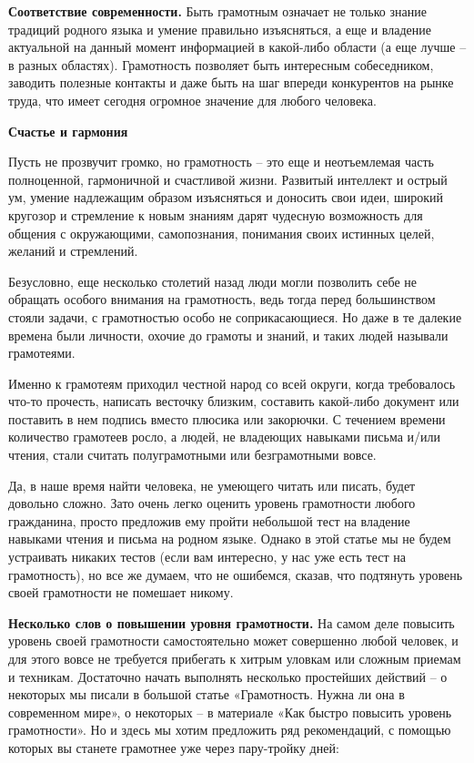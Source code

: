 \textbf{Соответствие современности.} Быть грамотным означает не только знание традиций родного языка и умение правильно изъясняться, а еще и владение актуальной на данный момент информацией в какой-либо области (а еще лучше – в разных областях). Грамотность позволяет быть интересным собеседником, заводить полезные контакты и даже быть на шаг впереди конкурентов на рынке труда, что имеет сегодня огромное значение для любого человека.

\textbf{Счастье и гармония}

Пусть не прозвучит громко, но грамотность – это еще и неотъемлемая часть полноценной, гармоничной и счастливой жизни. Развитый интеллект и острый ум, умение надлежащим образом изъясняться и доносить свои идеи, широкий кругозор и стремление к новым знаниям дарят чудесную возможность для общения с окружающими, самопознания, понимания своих истинных целей, желаний и стремлений.

Безусловно, еще несколько столетий назад люди могли позволить себе не обращать особого внимания на грамотность, ведь тогда перед большинством стояли задачи, с грамотностью особо не соприкасающиеся. Но даже в те далекие времена были личности, охочие до грамоты и знаний, и таких людей называли грамотеями.

Именно к грамотеям приходил честной народ со всей округи, когда требовалось что-то прочесть, написать весточку близким, составить какой-либо документ или поставить в нем подпись вместо плюсика или закорючки. С течением времени количество грамотеев росло, а людей, не владеющих навыками письма и/или чтения, стали считать полуграмотными или безграмотными вовсе.

Да, в наше время найти человека, не умеющего читать или писать, будет довольно сложно. Зато очень легко оценить уровень грамотности любого гражданина, просто предложив ему пройти небольшой тест на владение навыками чтения и письма на родном языке. Однако в этой статье мы не будем устраивать никаких тестов (если вам интересно, у нас уже есть тест на грамотность), но все же думаем, что не ошибемся, сказав, что подтянуть уровень своей грамотности не помешает никому.


\textbf{Несколько слов о повышении уровня грамотности.} На самом деле повысить уровень своей грамотности самостоятельно может совершенно любой человек, и для этого вовсе не требуется прибегать к хитрым уловкам или сложным приемам и техникам. Достаточно начать выполнять несколько простейших действий – о некоторых мы писали в большой статье «Грамотность. Нужна ли она в современном мире», о некоторых – в материале «Как быстро повысить уровень грамотности». Но и здесь мы хотим предложить ряд рекомендаций, с помощью которых вы станете грамотнее уже через пару-тройку дней:

